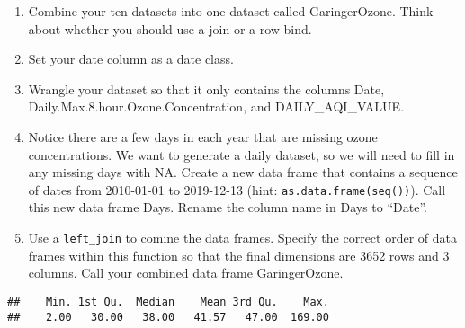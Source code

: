 \documentclass[
]{article}
\newenvironment{Shaded}{\begin{snugshade}}{\end{snugshade}}
\newcommand{\CommentTok}[1]{\textcolor[rgb]{0.56,0.35,0.01}{\textit{#1}}}
\newcommand{\DataTypeTok}[1]{\textcolor[rgb]{0.13,0.29,0.53}{#1}}
\newcommand{\FloatTok}[1]{\textcolor[rgb]{0.00,0.00,0.81}{#1}}
\newcommand{\KeywordTok}[1]{\textcolor[rgb]{0.13,0.29,0.53}{\textbf{#1}}}
\newcommand{\NormalTok}[1]{#1}
\newcommand{\OperatorTok}[1]{\textcolor[rgb]{0.81,0.36,0.00}{\textbf{#1}}}
\newcommand{\StringTok}[1]{\textcolor[rgb]{0.31,0.60,0.02}{#1}}
\begin{document}
\begin{enumerate}
\def\labelenumi{\arabic{enumi}.}
\setcounter{enumi}{1}
\item
  Combine your ten datasets into one dataset called GaringerOzone. Think
  about whether you should use a join or a row bind.
\item
  Set your date column as a date class.
\item
  Wrangle your dataset so that it only contains the columns Date,
  Daily.Max.8.hour.Ozone.Concentration, and DAILY\_AQI\_VALUE.
\item
  Notice there are a few days in each year that are missing ozone
  concentrations. We want to generate a daily dataset, so we will need
  to fill in any missing days with NA. Create a new data frame that
  contains a sequence of dates from 2010-01-01 to 2019-12-13 (hint:
  \texttt{as.data.frame(seq())}). Call this new data frame Days. Rename
  the column name in Days to ``Date''.
\item
  Use a \texttt{left\_join} to comine the data frames. Specify the
  correct order of data frames within this function so that the final
  dimensions are 3652 rows and 3 columns. Call your combined data frame
  GaringerOzone.
\end{enumerate}

\begin{Shaded}
\end{Shaded}

\begin{verbatim}
##    Min. 1st Qu.  Median    Mean 3rd Qu.    Max. 
##    2.00   30.00   38.00   41.57   47.00  169.00
\end{verbatim}
\end{document}
